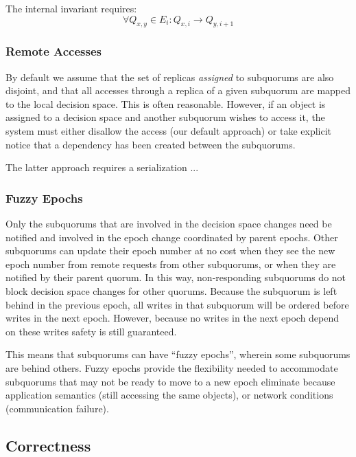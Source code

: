 \documentclass[11pt,letterpaper]{article}
\begin{document}
\begin{definition}
  The internal invariant requires:
  \begin{displaymath}
  \forall Q_{x,y} \in E_i : Q_{x,i} \rightarrow Q_{y,i+1}
  \end{displaymath}
\end{definition}

\subsubsection{Remote Accesses}

By default we assume that the set of replicas \textit{assigned} to subquorums are also
disjoint, and that all accesses through a replica of a given subquorum are mapped to the
local decision space.
This is often reasonable.
However, if an object is assigned to a decision space and another subquorum wishes to
access it, the system must either disallow the access (our default approach) or take
explicit notice that a dependency has been created between the subquorums.

The latter approach requires a serialization ... 

\subsubsection{Fuzzy Epochs}

Only the subquorums that are involved in the  decision space changes need be notified and
involved in the epoch change coordinated by parent epochs.
Other subquorums can update their epoch number at no cost when they see the new epoch
number from remote requests from other subquorums, or when they are notified by their
parent quorum.
In this way, non-responding subquorums do not block decision space changes for other
quorums.
Because the subquorum is left behind in the previous epoch, all writes in that subquorum
will be ordered before writes in the next epoch.
However, because no writes in the next epoch depend on these writes safety is still
guaranteed.

This means that subquorums can have ``fuzzy epochs'', wherein some subquorums are behind
others.
Fuzzy epochs provide the flexibility needed to accommodate subquorums that may not be
ready
to move to a new epoch eliminate because application semantics (still accessing the same
objects), or network conditions (communication failure).

\subsection{Correctness}
\end{document}
